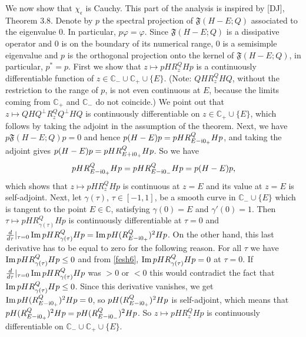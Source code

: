 \documentclass[letterpaper,onecolumn,11pt,accepted=2021-12-09]{quantumarticle}
\numberwithin{equation}{section}
\renewcommand{\i}{{\rm i}}
\begin{document}
We now show that $\chi_\epsilon$ is Cauchy. This part of the analysis is inspired by [DJ], Theorem 3.8. Denote by $p$ the spectral projection of ${\mathfrak F}(H-E;Q)$ associated to the eigenvalue $0$. In particular, $p\varphi=\varphi$. Since ${\mathfrak F}(H-E;Q)$ is a dissipative operator and $0$ is on the boundary of its numerical range, $0$ is a semisimple eigenvalue and $p$ is the orthogonal projection onto the kernel of ${\mathfrak F}(H-E;Q)$, in particular, $p^*=p$. 
 First we show that $z\mapsto pH R_z^QHp$ is a continuously differentiable function of $z\in {\mathbb C}_-\cup{\mathbb C}_+\cup \{E\}$.  (Note: $QHR_z^QHQ$, without the restriction to the range of $p$, is not even continuous at $E$, because the limits coming from ${\mathbb C}_+$ and ${\mathbb C}_-$ do not coincide.) We point out that $z\mapsto QHQ^\perp R_z^Q Q^\perp HQ$ is continuously differentiable on $z\in{\mathbb C}_+\cup\{E\}$, which follows by taking the adjoint in the assumption of the theorem. Next, we have $p {\mathfrak F}(H-E;Q) p=0$ and hence $p(H-E)p = pHR^Q_{E-\i 0_+}Hp$, and taking the adjoint gives $p(H-E)p = pHR^Q_{E+\i 0_+}Hp$.  So we have
\begin{equation}
	pHR^Q_{E-\i 0_+}Hp = pHR^Q_{E-\i 0_-}Hp = p(H-E)p,
	\label{fesh6}
\end{equation}
which shows that $z\mapsto pHR^Q_zHp$ is continuous at $z=E$ and its value at $z=E$ is self-adjoint. Next, let $\gamma(\tau)$, $\tau\in[-1,1]$, be a smooth curve in ${\mathbb C}_-\cup\{E\}$ which is tangent to the point $E\in{\mathbb C}$, satisfying  $\gamma(0)=E$ and $\gamma'(0)=1$. Then $\tau\mapsto pHR^Q_{\gamma(\tau)}Hp$ is continuously differentiable at $\tau=0$ and $\frac{d}{d\tau}|_{\tau=0}\, {\rm Im}\, pHR_{\gamma(\tau)}^QHp = {\rm Im} \, p H (R^Q_{E-\i 0_+})^2 Hp$. On the other hand, this last derivative has to be equal to zero for the following reason.  For all $\tau$ we have ${\rm Im}\, pHR_{\gamma(\tau)}^QHp\le 0$ and from \eqref{fesh6}, ${\rm Im}\, pHR_{\gamma(\tau)}^QHp= 0$ at $\tau=0$. If $\frac{d}{d\tau}|_{\tau=0}\, {\rm Im}\, pHR_{\gamma(\tau)}^QHp$ was $>0$ or $<0$ this would contradict the fact that ${\rm Im}\, pHR_{\gamma(\tau)}^QHp\le 0$. Since this derivative vanishes, we get  ${\rm Im} \, p H (R^Q_{E-\i 0_+})^2 Hp=0$, so $p H (R^Q_{E-\i 0_+})^2 Hp$ is self-adjoint, which means that $p H (R^Q_{E-\i 0_+})^2 Hp = p H (R^Q_{E-\i 0_-})^2 Hp$. So $z\mapsto pHR^Q_zHp$ is continuously differentiable on ${\mathbb C}_-\cup{\mathbb C}_+\cup\{E\}$. 
\end{document}
